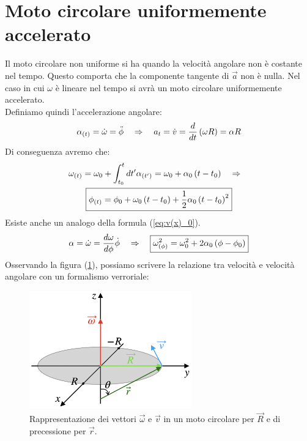 \section{Moto circolare uniformemente accelerato}
Il moto circolare non uniforme si ha quando la velocità angolare non è
costante nel tempo. Questo comporta che la componente tangente di $\vec a$ non è nulla. Nel caso in cui $\omega$ è lineare nel tempo si avrà un moto circolare uniformemente accelerato.
\\ Definiamo quindi l'accelerazione angolare:
\begin{equation}
    \alpha_{(t)} = \dot \omega = \ddot \phi\quad\Rightarrow\quad a_t = \dot v =
    \frac d{dt}\left( \omega R\right) = \alpha R
\end{equation}
Di conseguenza avremo che:
\begin{multline}
    \omega_{(t)} = \omega_0 + \int_{t_0}^tdt'\alpha_{(t')}  = \omega_0 + \alpha_0\left( t - t_0\right) \quad\Rightarrow\quad
    \\\boxed{\phi_{(t)} = \phi_0 + \omega_0\left( t - t_0\right)+ \frac12\alpha_0\left( t - t_0\right)^2}
\end{multline}
Esiste anche un analogo della formula (\ref{eq:v(x)_0}).
\begin{equation}
    \alpha =\dot \omega = \frac{d\omega}{d\phi}\dot\phi\quad\Rightarrow\quad
    \boxed{\omega^2_{(\phi)} = \omega_0^2 + 2\alpha_0\left(\phi-\phi_0\right)}
\label{eq:w(phi)}
\end{equation}
Osservando la figura (\ref{fig:rotantvector}), possiamo scrivere la relazione
tra velocità e velocità angolare con un formalismo verroriale:

\begin{figure}[htbp]
    \centering
        \includegraphics[width=7cm]{images/ovetr.png}
        \caption{Rappresentazione dei vettori $\vec\omega$ e $\vec v$ in un moto
        circolare per $\vec R$ e di precessione per $\vec r$.}
\label{fig:rotantvector}
\end{figure}

